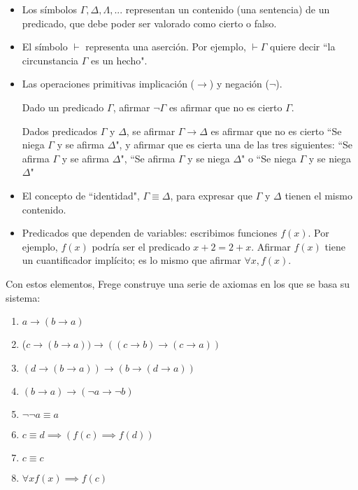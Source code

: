 \documentclass{article}
\begin{document}
\begin{itemize}
    \item Los símbolos $\Gamma, \Delta, \Lambda, ...$ representan un contenido (una sentencia) de un predicado, que debe poder ser valorado como cierto o falso. 
    \item El símbolo $\vdash$ representa una aserción. Por ejemplo, $\vdash \Gamma$ quiere decir ``la circunstancia $\Gamma$ es un hecho".
    \item Las operaciones primitivas implicación ($\rightarrow$) y negación ($\lnot$).
    
    Dado un predicado $\Gamma$, afirmar $\lnot \Gamma$ es afirmar que no es cierto $\Gamma$.
    
    Dados predicados $\Gamma$ y $\Delta$, se afirmar $\Gamma \rightarrow \Delta$ es afirmar que no es cierto ``Se niega $\Gamma$ y se afirma $\Delta$", y afirmar que es cierta una de las tres siguientes: ``Se afirma $\Gamma$ y se afirma $\Delta$", ``Se afirma $\Gamma$ y se niega $\Delta$" o ``Se niega $\Gamma$ y se niega $\Delta$"

    \item El concepto de ``identidad", $\Gamma \equiv \Delta$, para expresar que $\Gamma$ y $\Delta$ tienen el mismo contenido.
    \item Predicados que dependen de variables: escribimos funciones $f(x)$. Por ejemplo, $f(x)$ podría ser el predicado $x + 2 = 2 + x$. Afirmar $f(x)$ tiene un cuantificador implícito; es lo mismo que afirmar $\forall x, f(x)$.
\end{itemize}

Con estos elementos, Frege construye una serie de axiomas en los que se basa su sistema\cite{sullivan2004frege}:

\begin{enumerate}
    \item $a \rightarrow (b \rightarrow a)$
    \item ($c \rightarrow (b \rightarrow a)) \rightarrow ((c \rightarrow b) \rightarrow (c \rightarrow a))$
    \item $(d \rightarrow (b \rightarrow a)) \rightarrow (b \rightarrow (d \rightarrow a))$
    \item $(b \rightarrow a) \rightarrow (\lnot a \rightarrow \lnot b)$
    \item $\lnot \lnot a \equiv a$
    \item $c \equiv d \implies (f(c) \implies f(d))$
    \item $c \equiv c$
    \item $\forall x f(x) \implies f(c)$
\end{enumerate}
\end{document}
